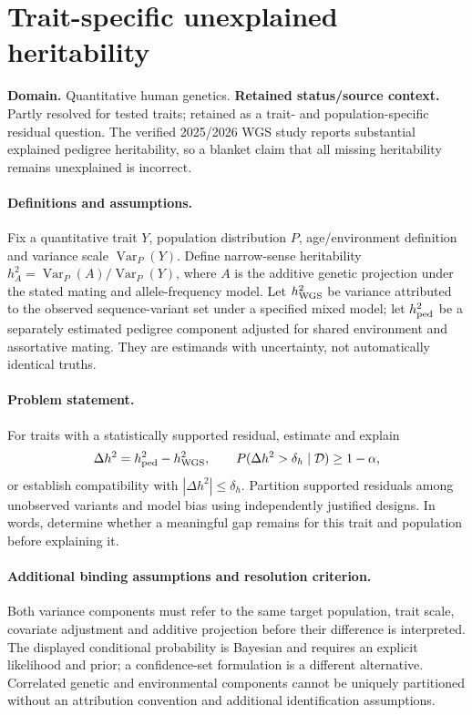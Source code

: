 \documentclass[11pt]{article}
\begin{document}
\section*{Trait-specific unexplained heritability}
\label{prob:023}
\label{rank:54}
\par\smallskip

\noindent\textbf{Domain.} Quantitative human genetics. \quad \textbf{Retained status/source context.} Partly resolved for tested traits; retained as a trait- and population-specific residual question. The verified 2025/2026 WGS study reports substantial explained pedigree heritability, so a blanket claim that all missing heritability remains unexplained is incorrect.
\paragraph{Definitions and assumptions.} Fix a quantitative trait $Y$, population distribution $P$, age/environment definition and variance scale $\operatorname{Var}_P(Y)$. Define narrow-sense heritability $h_A^2=\operatorname{Var}_P(A)/\operatorname{Var}_P(Y)$, where $A$ is the additive genetic projection under the stated mating and allele-frequency model. Let $h_{\rm WGS}^2$ be variance attributed to the observed sequence-variant set under a specified mixed model; let $h_{\rm ped}^2$ be a separately estimated pedigree component adjusted for shared environment and assortative mating. They are estimands with uncertainty, not automatically identical truths.
\paragraph{Problem statement.} For traits with a statistically supported residual, estimate and explain
\[
\Delta h^2=h_{\rm ped}^2-h_{\rm WGS}^2,
\qquad P(\Delta h^2>\delta_h\mid\mathcal D)\geq1-\alpha,
\]
or establish compatibility with $|\Delta h^2|\leq\delta_h$. Partition supported residuals among unobserved variants and model bias using independently justified designs. In words, determine whether a meaningful gap remains for this trait and population before explaining it.
\paragraph{Additional binding assumptions and resolution criterion.} Both variance components must refer to the same target population, trait scale, covariate adjustment and additive projection before their difference is interpreted. The displayed conditional probability is Bayesian and requires an explicit likelihood and prior; a confidence-set formulation is a different alternative. Correlated genetic and environmental components cannot be uniquely partitioned without an attribution convention and additional identification assumptions.
\end{document}
